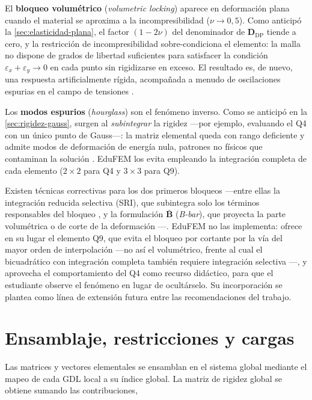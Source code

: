 El \textbf{bloqueo volumétrico} (\emph{volumetric locking}) aparece en deformación plana cuando el material se aproxima a la incompresibilidad ($\nu \to 0{,}5$). Como anticipó la \autoref{sec:elasticidad-plana}, el factor $(1-2\nu)$ del denominador de $\bm{D}_{\text{DP}}$ tiende a cero, y la restricción de incompresibilidad sobre-condiciona el elemento: la malla no dispone de grados de libertad suficientes para satisfacer la condición $\varepsilon_x + \varepsilon_y \to 0$ en cada punto sin rigidizarse en exceso. El resultado es, de nuevo, una respuesta artificialmente rígida, acompañada a menudo de oscilaciones espurias en el campo de tensiones \autocites[pp.~192, 208]{hughes2000fem}[pp.~282-283]{bathe2014fem}.

Los \textbf{modos espurios} (\emph{hourglass}) son el fenómeno inverso. Como se anticipó en la \autoref{sec:rigidez-gauss}, surgen al \emph{subintegrar} la rigidez —por ejemplo, evaluando el Q4 con un único punto de Gauss—: la matriz elemental queda con rango deficiente y admite modos de deformación de energía nula, patrones no físicos que contaminan la solución \autocites[p.~223]{cook2002concepts}[pp.~472-473]{bathe2014fem}. EduFEM los evita empleando la integración completa de cada elemento ($2\times2$ para Q4 y $3\times3$ para Q9).

Existen técnicas correctivas para los dos primeros bloqueos —entre ellas la integración reducida selectiva (SRI), que subintegra solo los términos responsables del bloqueo \autocites[p.~221]{hughes2000fem}[pp.~476-477]{bathe2014fem}, y la formulación $\bar{\bm{B}}$ (\emph{B-bar}), que proyecta la parte volumétrica o de corte de la deformación \autocite[pp.~232-234]{hughes2000fem}—. EduFEM no las implementa: ofrece en su lugar el elemento Q9, que evita el bloqueo por cortante por la vía del mayor orden de interpolación —no así el volumétrico, frente al cual el bicuadrático con integración completa también requiere integración selectiva \autocite[p.~222]{hughes2000fem}—, y aprovecha el comportamiento del Q4 como recurso didáctico, para que el estudiante observe el fenómeno en lugar de ocultárselo. Su incorporación se plantea como línea de extensión futura entre las recomendaciones del trabajo.

\section{Ensamblaje, restricciones y cargas}
\label{sec:ensamblaje}

Las matrices y vectores elementales se ensamblan en el sistema global mediante el mapeo de cada GDL local a su índice global. La matriz de rigidez global se obtiene sumando las contribuciones,

